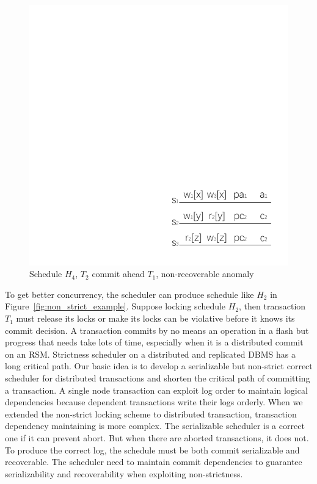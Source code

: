 \documentclass[conference]{IEEEtran}
\begin{document}
\begin{figure}[htbp]
  \centerline{\includegraphics[scale=1]{figure/schedule_not_recoverable.pdf}}
  \caption{Schedule ${H_4}$, ${T_2}$ commit ahead ${T_1}$, non-recoverable anomaly}
  \label{fig:schedule_not_recoverable}
\end{figure}


To get better concurrency, the scheduler can produce schedule like ${H_2}$ in Figure~\ref{fig:non_strict_example}. 
Suppose locking schedule ${H_2}$, then transaction ${T_1}$ must release its locks or make its locks can be violative before it knows its commit decision.
A transaction commits by no means an operation in a flash but progress that needs take lots of time, especially when it is a distributed commit on an RSM.
Strictness scheduler on a distributed and replicated DBMS has a long critical path.
Our basic idea is to develop a serializable but non-strict correct scheduler for distributed transactions and shorten the critical path of committing a transaction.
A single node transaction can exploit log order to maintain logical dependencies because dependent transactions write their logs orderly\cite{ELR:dewitt_implementation_1984}\cite{EfficientLocking:conf/vldb/KimuraGK12}.
When we extended the non-strict locking scheme to distributed transaction, transaction dependency maintaining is more complex.
The serializable scheduler is a correct one if it can prevent abort.
But when there are aborted transactions, it does not.
To produce the correct log, the schedule must be both commit serializable and recoverable\cite{UnifyCR:journals/is/AlonsoVABASW94}.
The scheduler need to maintain commit dependencies to guarantee serializability and recoverability when exploiting non-strictness.
\end{document}
